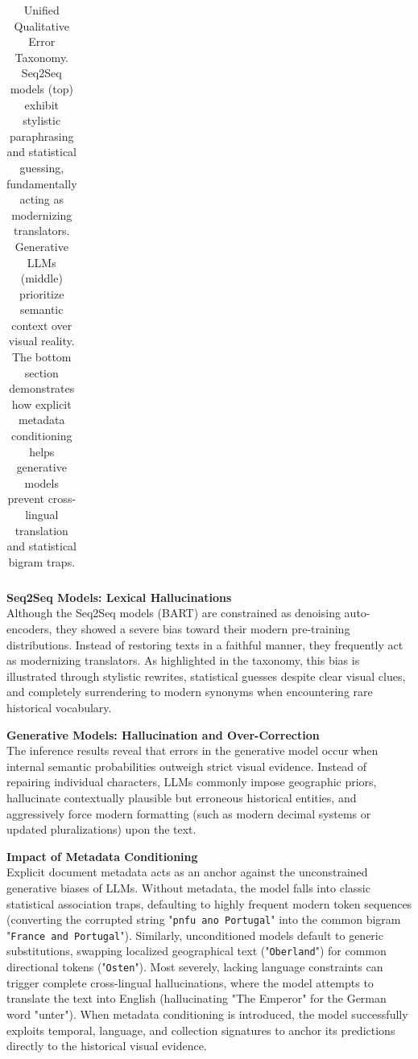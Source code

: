 \documentclass[11pt]{extarticle}
\begin{document}
\begin{table}[H]
{\begin{tabular}{>{\raggedright\arraybackslash}p{2.8cm} >{\raggedright\arraybackslash}p{4cm} >{\raggedright\arraybackslash}p{4.5cm} >{\raggedright\arraybackslash}p{4cm}}
    \bottomrule
    \end{tabular}%
    }
    \caption{Unified Qualitative Error Taxonomy. Seq2Seq models (top) exhibit stylistic paraphrasing and statistical guessing, fundamentally acting as modernizing translators. Generative LLMs (middle) prioritize semantic context over visual reality. The bottom section demonstrates how explicit metadata conditioning helps generative models prevent cross-lingual translation and statistical bigram traps.}
    \label{tab:unified_qualitative}
\end{table}

\noindent\textbf{Seq2Seq Models: Lexical Hallucinations}\\
Although the Seq2Seq models (BART) are constrained as denoising auto-encoders, they showed a severe bias toward their modern pre-training distributions. Instead of restoring texts in a faithful manner, they frequently act as modernizing translators. As highlighted in the taxonomy, this bias is illustrated through stylistic rewrites, statistical guesses despite clear visual clues, and completely surrendering to modern synonyms when encountering rare historical vocabulary.

\noindent\textbf{Generative Models: Hallucination and Over-Correction}\\
The inference results reveal that errors in the generative model occur when internal semantic probabilities outweigh strict visual evidence. Instead of repairing individual characters, LLMs commonly impose geographic priors, hallucinate contextually plausible but erroneous historical entities, and aggressively force modern formatting (such as modern decimal systems or updated pluralizations) upon the text. 

\noindent\textbf{Impact of Metadata Conditioning}\\
Explicit document metadata acts as an anchor against the unconstrained generative biases of LLMs. Without metadata, the model falls into classic statistical association traps, defaulting to highly frequent modern token sequences (converting the corrupted string "\texttt{pnfu ano Portugal}" into the common bigram "\texttt{France and Portugal}"). Similarly, unconditioned models default to generic substitutions, swapping localized geographical text ("\texttt{Oberland}") for common directional tokens ("\texttt{Osten}"). Most severely, lacking language constraints can trigger complete cross-lingual hallucinations, where the model attempts to translate the text into English (hallucinating "The Emperor" for the German word "unter"). When metadata conditioning is introduced, the model successfully exploits temporal, language, and collection signatures to anchor its predictions directly to the historical visual evidence.
\end{document}
